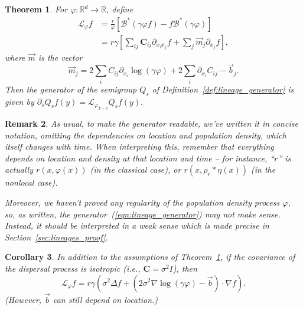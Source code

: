 \documentclass[12pt]{article}
\newtheorem{theorem}{Theorem}[section]
\newtheorem{remark}[theorem]{Remark}
\newtheorem{corollary}[theorem]{Corollary}
\newcommand{\IR}{\mathbb R}
\newcommand{\grad}{\nabla}
\newcommand{\DG}{\mathcal{B}}  %
\newcommand{\meanq}{\vec b}    %
\newcommand{\covq}{\mathbf{C}}     %
\newcommand{\kernel}{\rho}  %
\newcommand{\smooth}[1]{\kernel_{#1} \! * \!}  %
\newcommand{\Lgen}{\mathcal{L}}    %
\numberwithin{equation}{section}
\begin{document}
\begin{theorem} \label{thm:lineages}
    For $\varphi: \IR^d \to \IR$, define
    \begin{align}
        \label{eqn:lineage_generator}
        \Lgen_\varphi f
        &=
        \frac{r}{\varphi}
        \left[
            \DG^*(\gamma \varphi f) 
            - f \DG^* (\gamma \varphi)
        \right] \\
        &= \label{eqn:lineage_generator2}
        r\gamma
        \left[
            \sum_{ij} \covq_{ij} \partial_{x_ix_j} f
            + \sum_j \vec{m}_j \partial_{x_j} f
        \right] ,
    \end{align}
    where $\vec{m}$ is the vector
    $$
    \vec{m}_j
    =
    2 \sum_i C_{ij} \partial_{x_i} \log(\gamma \varphi)
    + 2 \sum_i \partial_{x_i} C_{ij}
    - \meanq_j .
    $$
    Then the generator of the semigroup $Q_s$
    of Definition~\ref{def:lineage_generator} is given by
	$\partial_sQ_sf(y)= \Lgen_{\varphi_{T-s}}Q_sf(y).$ 
\end{theorem}
\begin{remark}
As usual,
to make the generator readable, we've written it in concise notation,
omitting the dependencies on location and population density,
which itself changes with time.
When interpreting this,
remember that everything depends on location and density at that location and time --
for instance, ``$r$'' is actually $r(x, \varphi(x))$ (in the classical case),
or $r(x, \smooth{r} \eta(x))$ (in the nonlocal case).

Moreover, we haven't proved any regularity of the population density process $\varphi$,
so, as written, the generator~(\ref{eqn:lineage_generator})
may not make sense. Instead, it should be interpreted in a weak sense which is made precise
in Section~\ref{sec:lineages_proof}.
\end{remark}

\begin{corollary} \label{cor:lineages_simple}
    In addition to the assumptions of Theorem~\ref{thm:lineages},
    if the covariance of the dispersal process is isotropic
    (i.e., $\covq = \sigma^2 I$),
    then
    \begin{equation}
        \Lgen_\varphi f
        =
        r \gamma
        \left(
            \sigma^2 \Delta f
            +
            \left(
                2 \sigma^2 \grad \log(\gamma \varphi)
                - \meanq
            \right)
            \cdot \grad f
        \right) .
    \end{equation}
    (However, $\meanq$ can still depend on location.)
\end{corollary}
\end{document}
